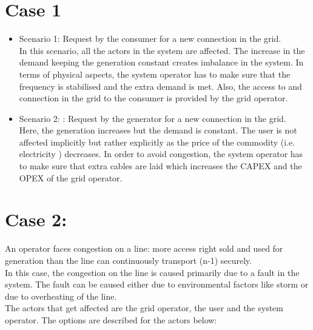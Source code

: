 \justifying

\section{\textbf{Case 1}}
\begin{itemize}
    \item Scenario 1:  Request by the consumer for a new connection in the grid.
    \\In this scenario, all the actors in the system are affected. The increase in the demand keeping the generation constant creates imbalance in the system.  In terms of physical aspects, the system operator has to make sure that the frequency is stabilised and the extra demand is met. Also,  the access to and connection in the grid to the consumer is provided by the grid operator. 
    \item Scenario 2: :  Request by the generator for a new connection in the grid.
	\\Here, the generation increases but the demand is constant. The user is not affected implicitly   but rather explicitly as the price of the commodity (i.e. electricity ) decreases.  In order to avoid congestion, the system operator has to make sure that extra cables are laid which increases the CAPEX  and the OPEX of the grid operator.
\end{itemize}



\section{\textbf{Case 2:}}
An operator faces congestion on a line: more access right sold and used for generation than the line can continuously transport (n-1) securely.\\
In this case, the congestion on the line is caused primarily due to a fault in the system. The fault can be caused either due to environmental factors like storm or due to overheating of the line. \\
The actors that get affected are the grid operator, the user and the system operator. The options are described for the actors below: 

